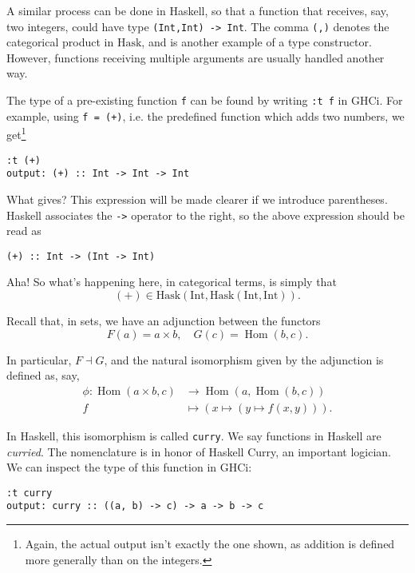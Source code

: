 \documentclass[11pt]{article}
\theoremstyle{nonumberplain}
\newcommand{\Hask}{\mathrm{Hask}}
\newcommand{\type}[1]{\mathrm{#1}}
\DeclareMathOperator{\Hom}{Hom}
\newcommand*\lsin{\lstinline}
\begin{document}
A similar process can be done in Haskell, so that a function that receives, say, two integers, could have type \lsin|(Int,Int) -> Int|. The comma \lsin|(,)| denotes the categorical product in $\Hask$, and is another example of a type constructor. However, functions receiving multiple arguments are usually handled another way.

The type of a pre-existing function \lsin|f| can be found by writing \lsin|:t f| in GHCi. For example, using \lsin|f = (+)|, i.e. the predefined function which adds two numbers, we get\footnote{Again, the actual output isn't exactly the one shown, as addition is defined more generally than on the integers.}
\begin{lstlisting}
:t (+)
output: (+) :: Int -> Int -> Int
\end{lstlisting}

What gives? This expression will be made clearer if we introduce parentheses. Haskell associates the \lsin|->| operator to the right, so the above expression should be read as
\begin{lstlisting}
(+) :: Int -> (Int -> Int)
\end{lstlisting}

Aha! So what's happening here, in categorical terms, is simply that
\begin{equation}
(+) \in \Hask(\type{Int}, \Hask(\type{Int}, \type{Int})).
\end{equation}

Recall that, in sets, we have an adjunction between the functors
\begin{equation}
F(a) = a \times b, \quad G(c) = \Hom(b,c).
\end{equation}

In particular, $F \dashv G$, and the natural isomorphism given by the adjunction is defined as, say,
\begin{equation}
\begin{aligned}
\phi \colon \Hom(a \times b, c) &\to \Hom(a, \Hom(b,c))\\
f &\mapsto (x \mapsto (y \mapsto f(x,y))).
\end{aligned}
\end{equation}

In Haskell, this isomorphism is called \lsin|curry|. We say functions in Haskell are \emph{curried}. The nomenclature is in honor of Haskell Curry, an important logician. We can inspect the type of this function in GHCi:
\begin{lstlisting}
:t curry
output: curry :: ((a, b) -> c) -> a -> b -> c
\end{lstlisting}
\end{document}

